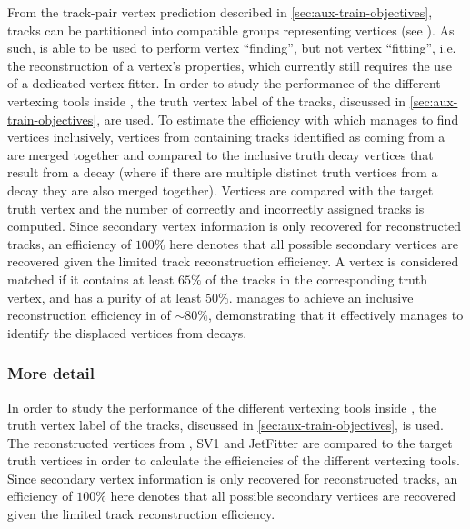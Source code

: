 From the track-pair vertex prediction described in \cref{sec:aux-train-objectives}, tracks can be partitioned into compatible groups representing vertices (see \cite{serviansky2020set2graph}).
As such, \GNN is able to be used to perform vertex ``finding'', but not vertex ``fitting'', i.e. the reconstruction of a vertex's properties, which currently still requires the use of a dedicated vertex fitter.
In order to study the performance of the different vertexing tools inside \bjets, the truth vertex label of the tracks, discussed in \cref{sec:aux-train-objectives}, are used.
To estimate the efficiency with which \GNN manages to find vertices inclusively, vertices from \GNN containing tracks identified as coming from a \bhadron are merged together and compared to the inclusive truth decay vertices that result from a \bhadron decay (where if there are multiple distinct truth vertices from a \bhadron decay they are also merged together).
Vertices are compared with the target truth vertex and the number of correctly and incorrectly assigned tracks is computed.
Since secondary vertex information is only recovered for reconstructed tracks, an efficiency of $100\%$ here denotes that all possible secondary vertices are recovered given the limited track reconstruction efficiency.
A vertex is considered matched if it contains at least $65\%$ of the tracks in the corresponding truth vertex, and has a purity of at least $50\%$.
\GNN manages to achieve an inclusive reconstruction efficiency in \bjets of $\sim80\%$, demonstrating that it effectively manages to identify the displaced vertices from \bhadron decays.

\subsubsection{More detail}

In order to study the performance of the different vertexing tools inside \bjets, the truth vertex label of the tracks, discussed in \cref{sec:aux-train-objectives}, is used.
The reconstructed vertices from \GNN, SV1 and JetFitter are compared to the target truth vertices in order to calculate the efficiencies of the different vertexing tools.
Since secondary vertex information is only recovered for reconstructed tracks, an efficiency of $100\%$ here denotes that all possible secondary vertices are recovered given the limited track reconstruction efficiency.

